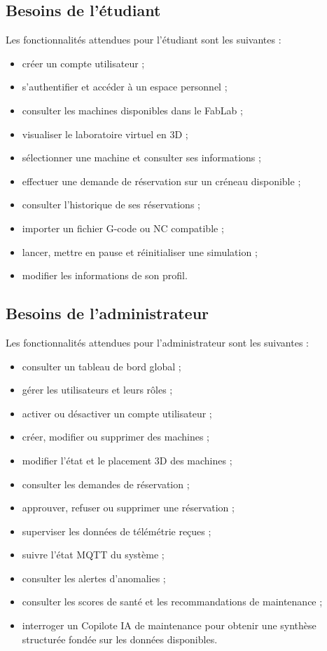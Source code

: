 \subsection{Besoins de l’étudiant}

Les fonctionnalités attendues pour l’étudiant sont les suivantes :

\begin{itemize}
    \item créer un compte utilisateur ;
    \item s’authentifier et accéder à un espace personnel ;
    \item consulter les machines disponibles dans le FabLab ;
    \item visualiser le laboratoire virtuel en 3D ;
    \item sélectionner une machine et consulter ses informations ;
    \item effectuer une demande de réservation sur un créneau disponible ;
    \item consulter l’historique de ses réservations ;
    \item importer un fichier G-code ou NC compatible ;
    \item lancer, mettre en pause et réinitialiser une simulation ;
    \item modifier les informations de son profil.
\end{itemize}

\subsection{Besoins de l’administrateur}

Les fonctionnalités attendues pour l’administrateur sont les suivantes :

\begin{itemize}
    \item consulter un tableau de bord global ;
    \item gérer les utilisateurs et leurs rôles ;
    \item activer ou désactiver un compte utilisateur ;
    \item créer, modifier ou supprimer des machines ;
    \item modifier l’état et le placement 3D des machines ;
    \item consulter les demandes de réservation ;
    \item approuver, refuser ou supprimer une réservation ;
    \item superviser les données de télémétrie reçues ;
    \item suivre l’état MQTT du système ;
    \item consulter les alertes d’anomalies ;
    \item consulter les scores de santé et les recommandations de maintenance ;
    \item interroger un Copilote IA de maintenance pour obtenir une synthèse structurée fondée sur les données disponibles.
\end{itemize}

